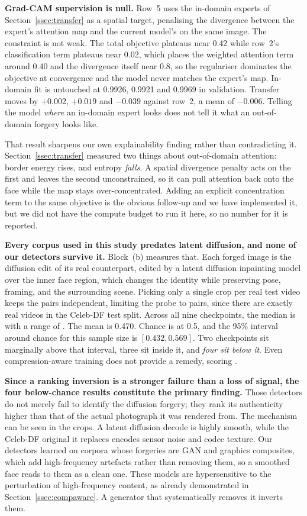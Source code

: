 \documentclass[journal,onecolumn]{IEEEtran}
\newcommand{\celebdf}{Celeb-DF}
\begin{document}
\textbf{Grad-CAM supervision is null.} Row~5 uses the in-domain experts of
Section~\ref{ssec:transfer} as a spatial target, penalising the divergence
between the expert's attention map and the current model's on the same image.
The constraint is not weak. The total objective plateaus near 0.42 while row~2's
classification term plateaus near 0.02, which places the weighted attention term
around 0.40 and the divergence itself near 0.8, so the regulariser dominates the
objective at convergence and the model never matches the expert's map. In-domain
fit is untouched at 0.9926, 0.9921 and 0.9969 in validation. Transfer moves by
$+0.002$, $+0.019$ and $-0.039$ against row~2, a mean of $-0.006$. Telling the
model \emph{where} an in-domain expert looks does not tell it what an
out-of-domain forgery looks like.

That result sharpens our own explainability finding rather than contradicting it.
Section~\ref{ssec:transfer} measured two things about out-of-domain attention:
border energy rises, and entropy \emph{falls}. A spatial divergence penalty acts
on the first and leaves the second unconstrained, so it can pull attention back
onto the face while the map stays over-concentrated. Adding an explicit
concentration term to the same objective is the obvious follow-up and we have
implemented it, but we did not have the compute budget to run it here, so no
number for it is reported.

\textbf{Every corpus used in this study predates latent diffusion, and none of our
detectors survive it.} Block~(b) measures that. Each forged image is the
diffusion edit of its real counterpart, edited by a latent diffusion inpainting
model over the inner face region, which changes the identity while preserving
pose, framing, and the surrounding scene. Picking only a single crop per real
test video keeps the pairs independent, limiting the probe to \ldmPairs{}
pairs, since there are exactly \ldmPairs{} real videos in the \celebdf{} test
split. Across all nine checkpoints, the median is \ldmMedian{} with a range of
\ldmAllRange{}. The mean is 0.470. Chance is at 0.5, and the 95\% interval
around chance for this sample size is $[0.432, 0.569]$. Two checkpoints sit
marginally above that interval, three sit inside it, and \emph{four sit below
it}. Even compression-aware training does not provide a remedy, scoring
\ldmHeavyRange{}.

\textbf{Since a ranking inversion is a stronger failure than a loss of signal,
the four below-chance results constitute the primary finding.} Those detectors
do not merely fail to identify the diffusion forgery; they rank its authenticity
higher than that of the actual photograph it was rendered from. The mechanism
can be seen in the crops. A latent diffusion decode is highly smooth, while the
\celebdf{} original it replaces encodes sensor noise and codec texture. Our
detectors learned on corpora whose forgeries are GAN and graphics composites,
which add high-frequency artefacts rather than removing them, so a smoothed face
reads to them as a clean one. These models are hypersensitive to the
perturbation of high-frequency content, as already demonstrated in
Section~\ref{ssec:compaware}. A generator that systematically removes it inverts
them.
\end{document}
